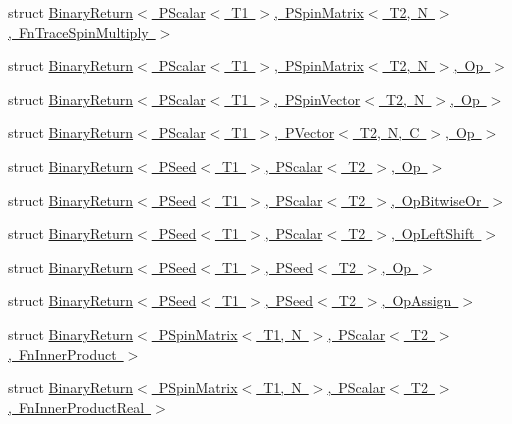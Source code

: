 \begin{DoxyCompactItemize}
\item 
struct \mbox{\hyperlink{structENSEM_1_1BinaryReturn_3_01PScalar_3_01T1_01_4_00_01PSpinMatrix_3_01T2_00_01N_01_4_00_01FnTraceSpinMultiply_01_4}{Binary\+Return$<$ P\+Scalar$<$ T1 $>$, P\+Spin\+Matrix$<$ T2, N $>$, Fn\+Trace\+Spin\+Multiply $>$}}
\item 
struct \mbox{\hyperlink{structENSEM_1_1BinaryReturn_3_01PScalar_3_01T1_01_4_00_01PSpinMatrix_3_01T2_00_01N_01_4_00_01Op_01_4}{Binary\+Return$<$ P\+Scalar$<$ T1 $>$, P\+Spin\+Matrix$<$ T2, N $>$, Op $>$}}
\item 
struct \mbox{\hyperlink{structENSEM_1_1BinaryReturn_3_01PScalar_3_01T1_01_4_00_01PSpinVector_3_01T2_00_01N_01_4_00_01Op_01_4}{Binary\+Return$<$ P\+Scalar$<$ T1 $>$, P\+Spin\+Vector$<$ T2, N $>$, Op $>$}}
\item 
struct \mbox{\hyperlink{structENSEM_1_1BinaryReturn_3_01PScalar_3_01T1_01_4_00_01PVector_3_01T2_00_01N_00_01C_01_4_00_01Op_01_4}{Binary\+Return$<$ P\+Scalar$<$ T1 $>$, P\+Vector$<$ T2, N, C $>$, Op $>$}}
\item 
struct \mbox{\hyperlink{structENSEM_1_1BinaryReturn_3_01PSeed_3_01T1_01_4_00_01PScalar_3_01T2_01_4_00_01Op_01_4}{Binary\+Return$<$ P\+Seed$<$ T1 $>$, P\+Scalar$<$ T2 $>$, Op $>$}}
\item 
struct \mbox{\hyperlink{structENSEM_1_1BinaryReturn_3_01PSeed_3_01T1_01_4_00_01PScalar_3_01T2_01_4_00_01OpBitwiseOr_01_4}{Binary\+Return$<$ P\+Seed$<$ T1 $>$, P\+Scalar$<$ T2 $>$, Op\+Bitwise\+Or $>$}}
\item 
struct \mbox{\hyperlink{structENSEM_1_1BinaryReturn_3_01PSeed_3_01T1_01_4_00_01PScalar_3_01T2_01_4_00_01OpLeftShift_01_4}{Binary\+Return$<$ P\+Seed$<$ T1 $>$, P\+Scalar$<$ T2 $>$, Op\+Left\+Shift $>$}}
\item 
struct \mbox{\hyperlink{structENSEM_1_1BinaryReturn_3_01PSeed_3_01T1_01_4_00_01PSeed_3_01T2_01_4_00_01Op_01_4}{Binary\+Return$<$ P\+Seed$<$ T1 $>$, P\+Seed$<$ T2 $>$, Op $>$}}
\item 
struct \mbox{\hyperlink{structENSEM_1_1BinaryReturn_3_01PSeed_3_01T1_01_4_00_01PSeed_3_01T2_01_4_00_01OpAssign_01_4}{Binary\+Return$<$ P\+Seed$<$ T1 $>$, P\+Seed$<$ T2 $>$, Op\+Assign $>$}}
\item 
struct \mbox{\hyperlink{structENSEM_1_1BinaryReturn_3_01PSpinMatrix_3_01T1_00_01N_01_4_00_01PScalar_3_01T2_01_4_00_01FnInnerProduct_01_4}{Binary\+Return$<$ P\+Spin\+Matrix$<$ T1, N $>$, P\+Scalar$<$ T2 $>$, Fn\+Inner\+Product $>$}}
\item 
struct \mbox{\hyperlink{structENSEM_1_1BinaryReturn_3_01PSpinMatrix_3_01T1_00_01N_01_4_00_01PScalar_3_01T2_01_4_00_01FnInnerProductReal_01_4}{Binary\+Return$<$ P\+Spin\+Matrix$<$ T1, N $>$, P\+Scalar$<$ T2 $>$, Fn\+Inner\+Product\+Real $>$}}

\end{DoxyCompactItemize}
